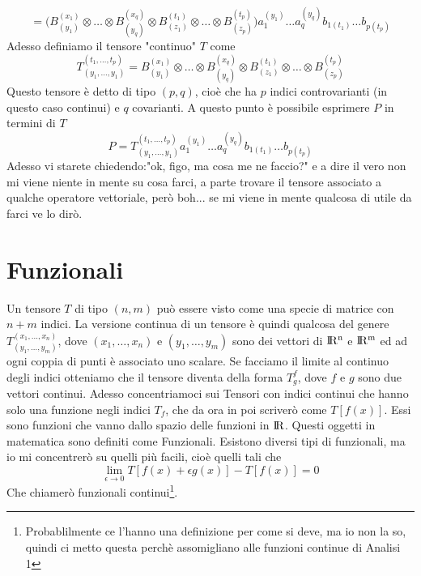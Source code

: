 \documentclass[11pt,a4paper]{report}
\theoremstyle{definition}
\theoremstyle{plain}
\theoremstyle{plain}
\begin{document}
			\[
				=\Big(B^{(x_1)}_{(y_1)}\otimes\dots\otimes B^{(x_q)}_{(y_q)}\otimes B_{(z_1)}^{(t_1)}\otimes\dots\otimes B_{(z_p)}^{(t_p)}\Big)a_1^{(y_1)}\dots a_q^{(y_q)}b_{1(t_1)}\dots b_{p(t_p)}
			\]
			Adesso definiamo il tensore "continuo" $T$ come
			\begin{equation}
				T_{(y_1,\dots,y_1)}^{(t_1,\dots,t_p)}=B^{(x_1)}_{(y_1)}\otimes\dots\otimes B^{(x_q)}_{(y_q)}\otimes B_{(z_1)}^{(t_1)}\otimes\dots\otimes B_{(z_p)}^{(t_p)}
			\end{equation}
			Questo tensore è detto di tipo $(p,q)$, cioè che ha $p$ indici controvarianti (in questo caso continui) e $q$ covarianti.\newline
			A questo punto è possibile esprimere $P$ in termini di $T$
			\begin{equation}
				P=T_{(y_1,\dots,y_1)}^{(t_1,\dots,t_p)}a_1^{(y_1)}\dots a_q^{(y_q)}b_{1(t_1)}\dots b_{p(t_p)}
			\end{equation}
			Adesso vi starete chiedendo:"ok, figo, ma cosa me ne faccio?" e a dire il vero non mi viene niente in mente su cosa farci, a parte trovare il tensore associato a qualche operatore vettoriale, però boh... se mi viene in mente qualcosa di utile da farci ve lo dirò.



		\section{Funzionali}
			Un tensore $T$ di tipo $(n,m)$ può essere visto come una specie di matrice con $n+m$ indici. La versione continua di un tensore è quindi qualcosa del genere $T^{(x_1,\dots,x_n)}_{(y_1,\dots,y_m)}$, dove $(x_1,\dots,x_n)$ e $(y_1,\dots,y_m)$ sono dei vettori di $\rm I\!R^n$ e $\rm I\!R^m$ ed ad ogni coppia di punti è associato uno scalare.\newline
			Se facciamo il limite al continuo degli indici otteniamo che il tensore diventa della forma $T^{f}_{g}$, dove $f$ e $g$ sono due vettori continui.\newline
			Adesso concentriamoci sui Tensori con indici continui che hanno solo una funzione negli indici $T_f$, che da ora in poi scriverò come $T[f(x)]$. Essi sono funzioni che vanno dallo spazio delle funzioni in $\rm I\!R$. Questi oggetti in matematica sono definiti come Funzionali.\newline
			Esistono diversi tipi di funzionali, ma io mi concentrerò su quelli più facili, cioè quelli tali che
			\begin{equation}
				\lim_{\epsilon 	\to 0}T[f(x)+\epsilon g(x)]-T[f(x)]=0
			\end{equation}
			Che chiamerò funzionali continui\footnote{Probablilmente ce l'hanno una definizione per come si deve, ma io non la so, quindi ci metto questa perchè assomigliano alle funzioni continue di Analisi 1}.
\end{document}
